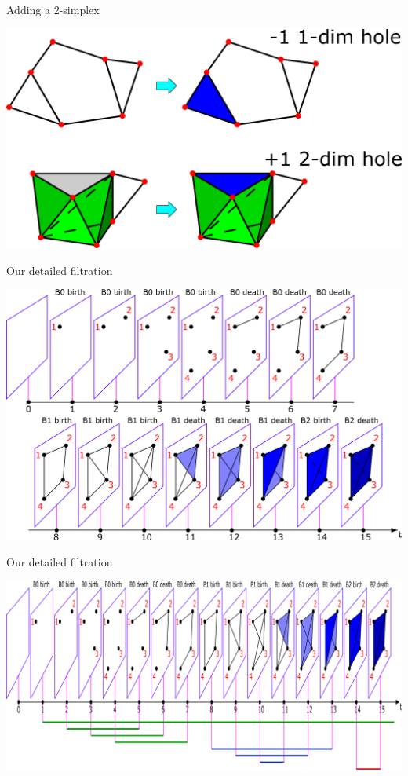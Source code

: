 \documentclass[10pt,xcolor={usenames}]{beamer}
\begin{document}
\begin{frame}{Adding a 2-simplex}

\begin{center}
\includegraphics[scale=0.35]{pictures/addSimplex.pdf}
\end{center}

\end{frame}

\begin{frame}{Our detailed filtration}

\begin{center}
\includegraphics[scale=0.17]{pictures/filtration5.pdf}
\end{center}
\end{frame}


\begin{frame}{Our detailed filtration}

\begin{center}
\includegraphics[scale=0.2]{pictures/filtration6.pdf}
\end{center}

\end{frame}
\end{document}
